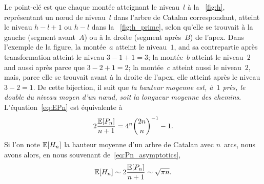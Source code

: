 Le point-clé est que chaque montée atteignant le niveau~\(l\) à la
\fig~\ref{fig:h}, représentant un nœud de niveau~\(l\) dans l'arbre de
Catalan correspondant, atteint le niveau $h-l+1$ ou $h-l$ dans la
\fig~\ref{fig:h_prime}, selon qu'elle se trouvait à la gauche (segment
avant~$A$) ou à la droite (segment après~$B$) de l'apex. Dans
l'exemple de la figure, la montée~\(a\) atteint le niveau~\(1\), and
sa contrepartie après transformation atteint le niveau \(3-1+1=3\); la
montée~\(b\) atteint le niveau~\(2\) and aussi après parce que
\(3-2+1=2\); la montée~\(c\) atteint aussi le niveau~\(2\), mais,
parce elle se trouvait avant à la droite de l'apex, elle atteint après
le niveau \(3-2=1\). De cette bijection, il suit que \emph{la hauteur
moyenne est, à~\(1\) près, le double du niveau moyen d'un nœud, soit
la longueur moyenne des chemins}. L'équation~\eqref{eq:EPn} est
équivalente à
\begin{equation*}
2\frac{\mathbb{E}[{P_n}]}{n+1} = 4^{n}\binom{2n}{n}^{-1} - 1.
\end{equation*}
Si l'on note \(\mathbb{E}[{H_n}]\) la hauteur moyenne d'un arbre de
Catalan avec
\(n\)~arcs, nous avons alors, en nous souvenant de~\eqref{eq:Pn_asymptotics},
\begin{equation*}
\mathbb{E}[{H_n}] \sim 2\frac{\mathbb{E}[{P_n}]}{n+1} \sim \sqrt{\pi n}.
\end{equation*}
